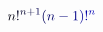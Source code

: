 \documentclass[12pt]{article}
\begin{document}
\makeatletter
\renewcommand*{\@textcolor}[3]{%
  \protect\leavevmode
  \begingroup
    \color#1{#2}#3%
  \endgroup
}
\makeatother
\begin{displaymath}
\mathcolor[RGB]{0,0,15}{n} \mathcolor[RGB]{0,0,30}{!} ^ { \mathcolor[RGB]{0,0,45}{n} \mathcolor[RGB]{0,0,60}{+} \mathcolor[RGB]{0,0,75}{1} } \mathcolor[RGB]{0,0,90}{(} \mathcolor[RGB]{0,0,105}{n} \mathcolor[RGB]{0,0,120}{-} \mathcolor[RGB]{0,0,135}{1} \mathcolor[RGB]{0,0,150}{)} \mathcolor[RGB]{0,0,165}{!} ^ { \mathcolor[RGB]{0,0,180}{n} }
\end{displaymath}
\end{document}
